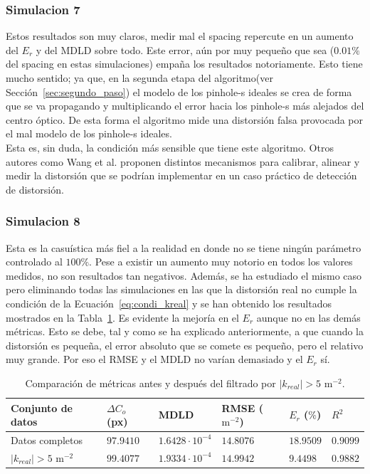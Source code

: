 \documentclass[12pt]{article}
\numberwithin{equation}{section}%
\newcommand{\lightit}[1]{{\lightitfont #1}}
\begin{document}
\subsubsection{Simulacion 7}

Estos resultados son muy claros, medir mal el \lightit{spacing} repercute en un aumento del \(E_r\) y del MDLD sobre todo. Este error, aún por muy pequeño que sea (\(0.01\%\) del \lightit{spacing} en estas simulaciones) empaña los resultados notoriamente. Esto tiene mucho sentido; ya que, en la segunda etapa del algoritmo(ver Sección\ \ref{sec:segundo_paso}) el modelo de los \lightit{pinhole}-s ideales se crea de forma que se va propagando y multiplicando el error hacia los \lightit{pinhole}-s más alejados del centro óptico. De esta forma el algoritmo mide una distorsión falsa provocada por el mal modelo de los \lightit{pinhole}-s ideales.\\

Esta es, sin duda, la condición más sensible que tiene este algoritmo. Otros autores como Wang et al. \cite{Wang2019DistortionDBS} proponen distintos mecanismos para calibrar, alinear y medir la distorsión que se podrían implementar en un caso práctico de detección de distorsión.


\subsubsection{Simulacion 8}

Esta es la casuística más fiel a la realidad en donde no se tiene ningún parámetro controlado al \(100\%\). Pese a existir un aumento muy notorio en todos los valores medidos, no son resultados tan negativos. Además, se ha estudiado el mismo caso pero eliminando todas las simulaciones en las que la distorsión real no cumple la condición de la Ecuación\ \ref{eq:condi_kreal} y se han obtenido los resultados mostrados en la Tabla\ \ref{tab:results8}. Es evidente la mejoría en el \(E_r\) aunque no en las demás métricas. Esto se debe, tal y como se ha explicado anteriormente, a que cuando la distorsión es pequeña, el error absoluto que se comete es pequeño, pero el relativo muy grande. Por eso el RMSE y el MDLD no varían demasiado y el \(E_r\) sí.

\begin{table}[ht]
\centering
\caption{\small Comparación de métricas antes y después del filtrado por $|k_{real}| > 5\text{ m}^{-2}$.}
\label{tab:results8}
\begin{tabular}{llllll}
\hline

Conjunto de datos &
$\Delta C_o$ (px) &
MDLD &
RMSE ($\text{m}^{-2}$) &
$E_r$ ($\%$) &
$R^2$ \\
\hline

Datos completos &
$97.9410$ &
$1.6428\cdot10^{-4}$ &
$14.8076$ &
$18.9509$ &
$0.9099$ \\

$|k_{real}|>5\text{ m}^{-2}$ &
$99.4077$ &
$1.9334\cdot10^{-4}$ &
$14.9942$ &
$9.4498$ &
$0.9882$ \\

\hline
\end{tabular}
\end{table}
\end{document}
